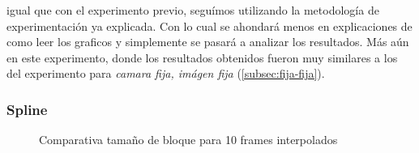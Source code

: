  igual que con el experimento previo, segu\'imos utilizando
la metodolog\'ia de experimentaci\'on ya explicada. Con lo cual se ahondar\'a
menos en explicaciones de como leer los graficos y simplemente se pasar\'a a
analizar los resultados. M\'as a\'un en este experimento, donde los resultados
obtenidos fueron muy similares a los del experimento para \emph{camara fija,
im\'agen fija} (\ref{subsec:fija-fija}).

\subsubsection{Spline}

\begin{figure}[H]
    \centering
    \caption{Comparativa tama\~no de bloque para 10 frames interpolados}
    \label{fig:movil-fija_spline-bloques}
\end{figure}

